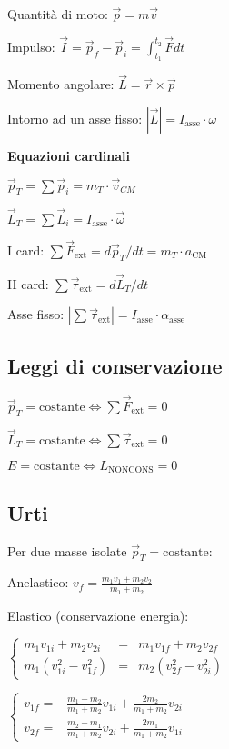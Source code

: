 \documentclass[10pt]{article}
\begin{document}
\begin{multicols}{3}
Quantit\`a di moto: $ \vec p = m\vec v$

Impulso: $\vec I = \vec p_f - \vec p_i = \int_{t_1}^{t_2} \vec F dt $

Momento angolare: $\vec L = \vec r \times \vec p$

Intorno ad un asse fisso: $|\vec L| = I_\mathrm{asse} \cdot \omega$

\textbf{Equazioni cardinali}

$\vec p_T = \sum \vec p_i = m_T \cdot \vec v_{CM}$

$\vec L_T = \sum \vec L_i = I_\mathrm{asse}\cdot \vec \omega$

I card: $\sum \vec F_\mathrm{ext} = d\vec p_T / dt = m_T \cdot a_\mathrm{CM}$

II card: $\sum \vec \tau_\mathrm{ext} = d\vec L_T / dt$

Asse fisso: $| \sum \vec \tau_\mathrm{ext} | = I_\mathrm{asse} \cdot \alpha_\mathrm{asse}$

\subsection*{Leggi di conservazione}

$\vec p_T = \mathrm{costante} \Leftrightarrow  \sum \vec F_\mathrm{ext} = 0 $

$\vec L_T = \mathrm{costante} \Leftrightarrow  \sum \vec \tau_\mathrm{ext} = 0 $

$ E = \mathrm{costante} \Leftrightarrow  L_\mathrm{NON CONS} = 0 $


\subsection*{Urti}

Per due masse isolate $\vec p_T = \mathrm{costante}$:

Anelastico: $v_f = \frac{m_1v_1+m_2v_2}{ m_1+m_2 }$

Elastico (conservazione energia):

$ \left\{
  \begin{matrix}
    m_1v_{1i} + m_2v_{2i} &=& m_1v_{1f}+m_2 v_{2f} \\
    m_1 ( v_{1i}^2-v_{1f}^2 ) &=& m_2 ( v_{2f}^2 - v_{2i}^2)
  \end{matrix}
\right. $

$\left\{ 
\begin{matrix}
  v_{1f} =& \frac {m_1-m_2} {m_1 + m_2} v_{1i} + \frac {2m_2} {m_1+m_2} v_{2i} \\
 v_{2f} =& \frac {m_2-m_1} {m_1 + m_2} v_{2i} + \frac {2m_1} {m_1+m_2} v_{1i}
\end{matrix}
\right. $



\end{multicols}
\end{document}
